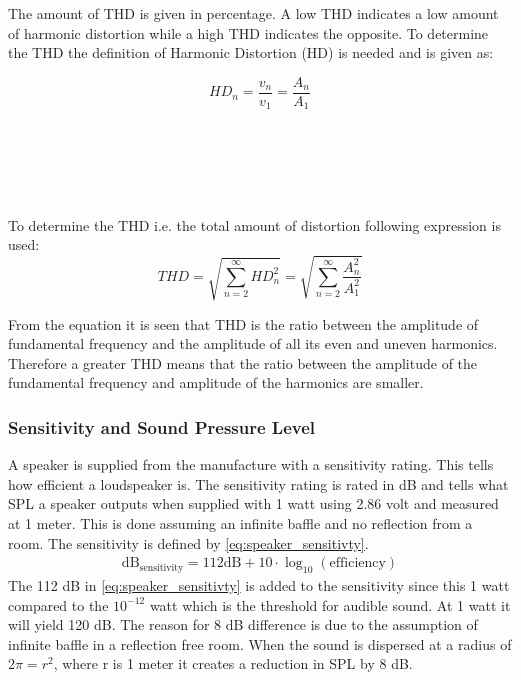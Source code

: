The amount of THD is given in percentage. A low THD indicates a low amount of harmonic distortion while a high THD indicates the opposite. To determine the THD the definition of Harmonic Distortion (HD) is needed and is given as:

\begin{equation}
H\!D_n = \frac{v_n}{v_1} =\frac{A_n}{A_1}
\end{equation}
\begin{where}
\\
\\
\\
\\
\end{where}

To determine the THD i.e. the total amount of distortion following expression is used:
$$
T\!H\!D = \sqrt{\sum_{n=2}^{\infty}H\!D_n^2} = \sqrt{\sum_{n=2}^{\infty}\frac{A_n^2}{A_1^2}}
$$

From the equation it is seen that THD is the ratio between the amplitude of fundamental frequency and the amplitude of all its even and uneven harmonics. Therefore a greater THD means that the ratio between the amplitude of the fundamental frequency and amplitude of the harmonics are smaller.


\subsubsection*{Sensitivity and Sound Pressure Level}

A speaker is supplied from the manufacture with a sensitivity rating. This tells how efficient a loudspeaker is. The sensitivity rating is rated in dB and tells what \gls{SPL} a speaker outputs when supplied with 1 watt using 2.86 volt and measured at 1 meter. This is done assuming an infinite baffle and no reflection from a room. The sensitivity is defined by \autoref{eq:speaker_sensitivty}.
\begin{align}\label{eq:speaker_sensitivty}
\text{dB}_\text{sensitivity}=112\text {dB} +10 \cdot \log_{10}(\text{efficiency})
\end{align}  
The 112 dB in \autoref{eq:speaker_sensitivty} is added to the sensitivity since this 1 watt compared to the $10^{-12}$ watt which is the threshold for audible sound. At 1 watt it will yield 120 dB. The reason for 8 dB difference is due to the assumption of infinite baffle in a reflection free room. When the sound is dispersed at a radius of $2\pi=r^2$, where r is 1 meter it creates a reduction in \gls{SPL} by 8 dB.

